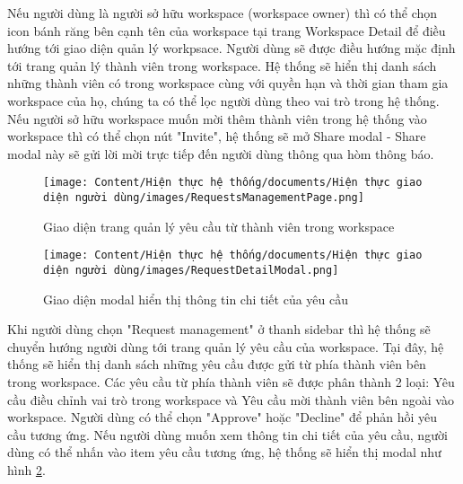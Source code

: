 Nếu người dùng là người sở hữu workspace (workspace owner) thì có thể chọn icon bánh răng bên cạnh tên của workspace tại trang Workspace Detail để điều hướng tới giao diện quản lý workpsace. Người dùng sẽ được điều hướng mặc định tới trang quản lý thành viên trong workspace. Hệ thống sẽ hiển thị danh sách những thành viên có trong workspace cùng với quyền hạn và thời gian tham gia workspace của họ, chúng ta có thể lọc người dùng theo vai trò trong hệ thống. Nếu người sở hữu workspace muốn mời thêm thành viên trong hệ thống vào workspace thì có thể chọn nút "Invite", hệ thống sẽ mở Share modal - Share modal này sẽ gửi lời mời trực tiếp đến người dùng thông qua hòm thông báo.

\begin{figure}[H]
    \centering
    \texttt{[image: Content/Hiện thực hệ thống/documents/Hiện thực giao diện người dùng/images/RequestsManagementPage.png]}
    \vspace{0.5cm}
    \caption{Giao diện trang quản lý yêu cầu từ thành viên trong workspace}
    \label{fig: Giao diện trang quản lý yêu cầu từ thành viên trong workspace}
\end{figure}

\begin{figure}[H]
    \centering
    \texttt{[image: Content/Hiện thực hệ thống/documents/Hiện thực giao diện người dùng/images/RequestDetailModal.png]}
    \vspace{0.5cm}
    \caption{Giao diện modal hiển thị thông tin chi tiết của yêu cầu}
    \label{fig: Giao diện modal hiển thị thông tin chi tiết của yêu cầu}
\end{figure}

Khi người dùng chọn "Request management" ở thanh sidebar thì hệ thống sẽ chuyển hướng người dùng tới trang quản lý yêu cầu của workspace. Tại đây, hệ thống sẽ hiển thị danh sách những yêu cầu được gửi từ phía thành viên bên trong workspace. Các yêu cầu từ phía thành viên sẽ được phân thành 2 loại: Yêu cầu điều chỉnh vai trò trong workspace và Yêu cầu mời thành viên bên ngoài vào workspace. Người dùng có thể chọn "Approve" hoặc "Decline" để phản hồi yêu cầu tương ứng. Nếu người dùng muốn xem thông tin chi tiết của yêu cầu, người dùng có thể nhấn vào item yêu cầu tương ứng, hệ thống sẽ hiển thị modal như hình \ref{fig: Giao diện modal hiển thị thông tin chi tiết của yêu cầu}.
